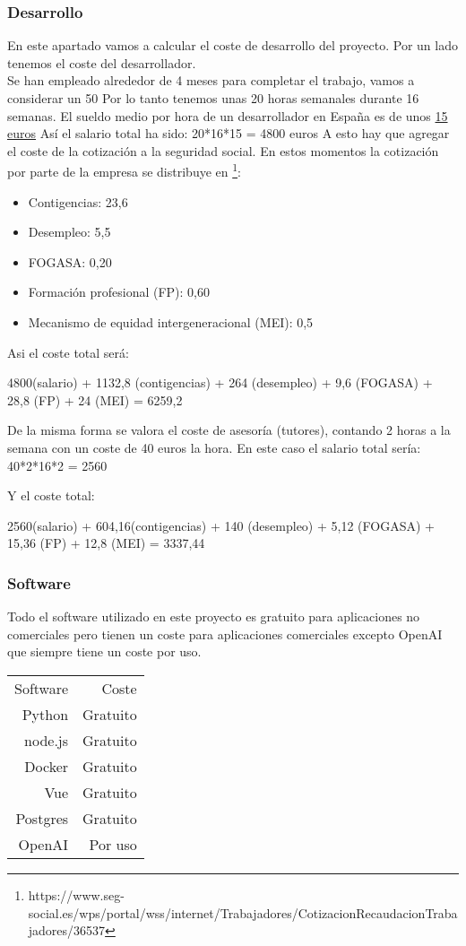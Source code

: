 \subsubsection{Desarrollo}
En este apartado vamos a calcular el coste de desarrollo del proyecto.
Por un lado tenemos el coste del desarrollador.\\
Se han empleado alrededor de 4 meses para completar el trabajo, vamos a considerar 
un 50%
Por lo tanto tenemos unas 20 horas semanales durante 16 semanas.
El sueldo medio por hora de un desarrollador en España es de unos \href{https://es.talent.com}{15 euros} 
Así el salario total ha sido: 20*16*15 = 4800 euros
A esto hay que agregar el coste de la cotización a la seguridad social.
En estos momentos la cotización por parte de la empresa se distribuye en 
\footnote{https://www.seg-social.es/wps/portal/wss/internet/Trabajadores/CotizacionRecaudacionTrabajadores/36537}:
\begin{itemize}
    \item Contigencias: 23,6%
    \item Desempleo: 5,5%
    \item FOGASA: 0,20
    \item Formación profesional (FP): 0,60%
    \item Mecanismo de equidad intergeneracional (MEI): 0,5%
\end{itemize}
Asi el coste total será:

4800(salario) + 1132,8 (contigencias) + 264 (desempleo) + 9,6 (FOGASA) + 28,8 (FP) + 24 (MEI) = 6259,2

De la misma forma se valora el coste de asesoría (tutores), contando 2 horas a la
 semana con un coste de 40 euros la hora. 
En este caso el salario total sería:
40*2*16*2 = 2560

Y el coste total: 

2560(salario) + 604,16(contigencias) +  140 (desempleo) + 5,12 (FOGASA) + 15,36 (FP) + 12,8 (MEI) = 3337,44

\subsubsection{Software}
Todo el software utilizado en este proyecto es gratuito para aplicaciones no comerciales pero tienen un 
coste para aplicaciones comerciales excepto OpenAI que siempre tiene un coste por uso.

\begin{tabular}{r r}
    Software & Coste\\
    Python & Gratuito \\
    node.js & Gratuito\\
    Docker & Gratuito\\
    Vue & Gratuito\\
    Postgres & Gratuito\\
    OpenAI & Por uso\\
\end{tabular}

